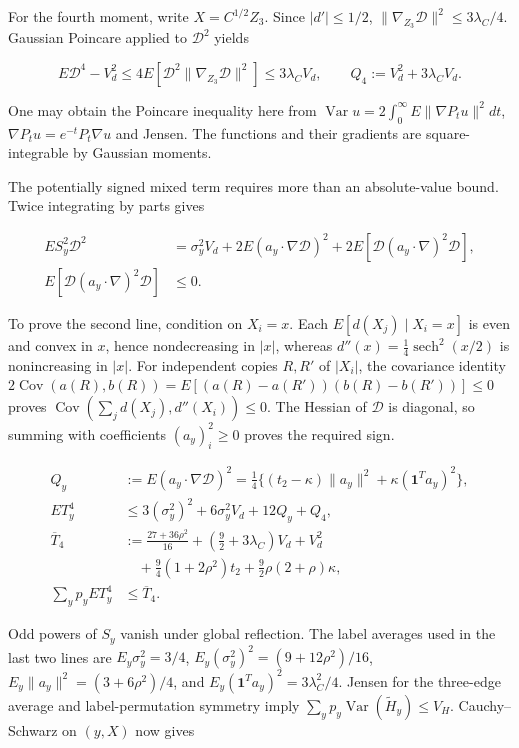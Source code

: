 \documentclass{article}
\begin{document}
For the fourth moment, write \(X=C^{1/2}Z_3\). Since \(|d'|\le1/2\),
\(\|\nabla_{Z_3}\mathcal D\|^2\le3\lambda_C/4\). Gaussian Poincare
applied to \(\mathcal D^2\) yields

\[
E\mathcal D^4-V_d^2\le4E[\mathcal D^2\|\nabla_{Z_3}\mathcal D\|^2]
\le3\lambda_CV_d,\qquad Q_4:=V_d^2+3\lambda_CV_d.
\tag{C.51}
\]

One may obtain the Poincare inequality here from
\(\operatorname{Var}u=2\int_0^\infty E\|\nabla P_tu\|^2dt\),
\(\nabla P_tu=e^{-t}P_t\nabla u\) and Jensen. The functions and their
gradients are square-integrable by Gaussian moments.

The potentially signed mixed term requires more than an absolute-value
bound. Twice integrating by parts gives

\[
\begin{aligned}
ES_y^2\mathcal D^2
&=\sigma_y^2V_d+2E(a_y\cdot\nabla\mathcal D)^2
+2E[\mathcal D(a_y\cdot\nabla)^2\mathcal D],\\
E[\mathcal D(a_y\cdot\nabla)^2\mathcal D]&\le0.
\end{aligned}
\tag{C.52}
\]

To prove the second line, condition on \(X_i=x\). Each
\(E[d(X_j)\mid X_i=x]\) is even and convex in \(x\), hence nondecreasing
in \(|x|\), whereas \(d''(x)=\tfrac14\operatorname{sech}^2(x/2)\) is
nonincreasing in \(|x|\). For independent copies \(R,R'\) of \(|X_i|\),
the covariance identity
\(2\operatorname{Cov}(a(R),b(R))=E[(a(R)-a(R'))(b(R)-b(R'))]\le0\)
proves \(\operatorname{Cov}(\sum_jd(X_j),d''(X_i))\le0\). The Hessian of
\(\mathcal D\) is diagonal, so summing with coefficients
\((a_y)_i^2\ge0\) proves the required sign.

\[
\begin{aligned}
Q_y&:=E(a_y\cdot\nabla\mathcal D)^2
=\tfrac14\{(t_2-\kappa)\|a_y\|^2+\kappa(\mathbf1^Ta_y)^2\},\\
ET_y^4&\le3(\sigma_y^2)^2+6\sigma_y^2V_d+12Q_y+Q_4,\\
\overline T_4&:=\frac{27+36\rho^2}{16}
+\left(\frac92+3\lambda_C\right)V_d+V_d^2\\
&\quad+\frac94(1+2\rho^2)t_2+\frac92\rho(2+\rho)\kappa,\\
\sum_yp_yET_y^4&\le\overline T_4.
\end{aligned}
\tag{C.53}
\]

Odd powers of \(S_y\) vanish under global reflection. The label averages
used in the last two lines are \(E_y\sigma_y^2=3/4\),
\(E_y(\sigma_y^2)^2=(9+12\rho^2)/16\), \(E_y\|a_y\|^2=(3+6\rho^2)/4\),
and \(E_y(\mathbf1^Ta_y)^2=3\lambda_C^2/4\). Jensen for the three-edge
average and label-permutation symmetry imply
\(\sum_yp_y\operatorname{Var}(\widetilde H_y)\le V_H\). Cauchy--Schwarz
on \((y,X)\) now gives
\end{document}
